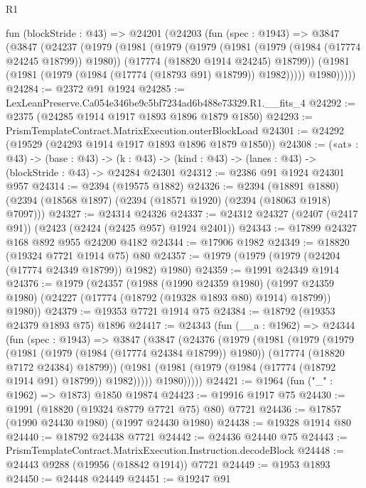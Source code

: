 \begin{lexlean}{R1}
\begin{coremodule}
  fun (blockStride : @43) =>
  @24201
    (@24203
      (fun (spec : @1943) =>
      @3847
        (@3847
          (@24237
            (@1979
              (@1981
                (@1979
                  (@1979
                    (@1981 (@1979 (@1984 (@17774 @24245 @18799)) @1980))
                    (@17774 (@18820 @1914 @24245) @18799))
                  (@1981 (@1981 (@1979 (@1984 (@17774 (@18793 @91) @18799)) @1982)))))
              @1980)))))
@24284 := @2372 @91 @1924
@24285 := LexLeanPreserve.Ca054e346be9c5bf7234ad6b488e73329.R1.__fits_4
@24292 := @2375 (@24285 @1914 @1917 @1893 @1896 @1879 @1850)
@24293 := PrismTemplateContract.MatrixExecution.outerBlockLoad
@24301 := @24292 (@19529 (@24293 @1914 @1917 @1893 @1896 @1879 @1850))
@24308 := («at» : @43) ->
  (base : @43) -> (k : @43) -> (kind : @43) -> (lanes : @43) -> (blockStride : @43) -> @24284 @24301
@24312 := @2386 @91 @1924 @24301 @957
@24314 := @2394 (@19575 @1882)
@24326 := @2394
    (@18891 @1880)
    (@2394 (@18568 @1897) (@2394 (@18571 @1920) (@2394 (@18063 @1918) @7097)))
@24327 := @24314 @24326
@24337 := @24312 @24327 (@2407 (@2417 @91)) (@2423 (@2424 (@2425 @957) @1924 @2401))
@24343 := @17899 @24327 @168 @892 @955 @24200 @4182
@24344 := @17906 @1982
@24349 := @18820 (@19324 @7721 @1914 @75) @80
@24357 := @1979 (@1979 (@1979 (@24204 (@17774 @24349 @18799)) @1982) @1980)
@24359 := @1991 @24349 @1914
@24376 := @1979
    (@24357
      (@1988
        (@1990 @24359 @1980)
        (@1997 @24359 @1980)
        (@24227 (@17774 (@18792 (@19328 @1893 @80) @1914) @18799))
        @1980))
@24379 := @19353 @7721 @1914 @75
@24384 := @18792 (@19353 @24379 @1893 @75) @1896
@24417 := @24343
    (fun (__a : @1962) =>
    @24344
      (fun (spec : @1943) =>
      @3847
        (@3847
          (@24376
            (@1979
              (@1981
                (@1979
                  (@1979
                    (@1981 (@1979 (@1984 (@17774 @24384 @18799)) @1980))
                    (@17774 (@18820 @7172 @24384) @18799))
                  (@1981 (@1981 (@1979 (@1984 (@17774 (@18792 @1914 @91) @18799)) @1982)))))
              @1980)))))
@24421 := @1964 (fun ("_" : @1962) => @1873) @1850 @19874
@24423 := @19916 @1917 @75
@24430 := @1991 (@18820 (@19324 @8779 @7721 @75) @80) @7721
@24436 := @17857 (@1990 @24430 @1980) (@1997 @24430 @1980)
@24438 := @19328 @1914 @80
@24440 := @18792 @24438 @7721
@24442 := @24436 @24440 @75
@24443 := PrismTemplateContract.MatrixExecution.Instruction.decodeBlock
@24448 := @24443 @9288 (@19956 (@18842 @1914)) @7721
@24449 := @1953 @1893
@24450 := @24448 @24449
@24451 := @19247 @91

\end{coremodule}
\end{lexlean}
